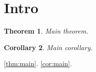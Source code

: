 \section{Intro}
\newtheorem{theorem}{Theorem}
\newtheorem{cor}[theorem]{Corollary}
\begin{theorem}\label{thm:main}
Main theorem.
\end{theorem}
\begin{cor}\label{cor:main}
Main corollary.
\end{cor}
\autoref{thm:main}. \autoref{cor:main}.
